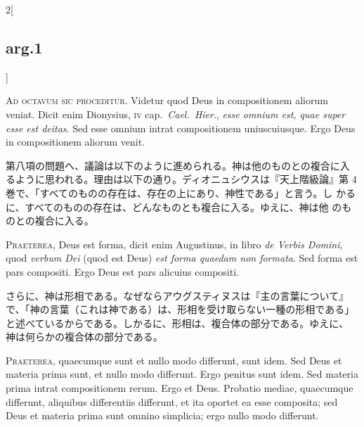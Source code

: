 \documentclass[paper=a4paper,fontsize=10pt,jafontsize=9pt,titlepage]{jlreq}
\begin{document}
\begin{paracol}{2}[\subsection{arg.1}]

{\huge A}{\scshape d octavum sic proceditur}. Videtur quod Deus in
 compositionem aliorum veniat. Dicit enim Dionysius, {\scshape iv}
 cap.~{\itshape Cael.~Hier}., {\itshape esse omnium est, quae super
 esse est deitas}. Sed esse omnium intrat compositionem
 uniuscuiusque. Ergo Deus in compositionem aliorum venit.

\switchcolumn

第八項の問題へ、議論は以下のように進められる。神は他のものとの複合に入
るように思われる。理由は以下の通り。ディオニュシウスは『天上階級論』第
4巻で、「すべてのものの存在は、存在の上にあり、神性である」と言う。し
かるに、すべてのものの存在は、どんなものとも複合に入る。ゆえに、神は他
のものとの複合に入る。


{\scshape Praeterea}, Deus est forma, dicit enim Augustinus, in libro
 {\itshape de Verbis Domini}, quod {\itshape verbum Dei} (quod est
 Deus) {\itshape est forma quaedam non formata}. Sed forma est pars
 compositi. Ergo Deus est pars alicuius compositi.

\switchcolumn

さらに、神は形相である。なぜならアウグスティヌスは『主の言葉について』
で、「神の言葉（これは神である）は、形相を受け取らない一種の形相である」
と述べているからである。しかるに、形相は、複合体の部分である。ゆえに、
神は何らかの複合体の部分である。


{\scshape Praeterea}, quaecumque sunt et nullo modo differunt, sunt
 idem. Sed Deus et materia prima sunt, et nullo modo differunt. Ergo
 penitus sunt idem. Sed materia prima intrat compositionem rerum. Ergo
 et Deus. Probatio mediae, quaecumque differunt, aliquibus differentiis
 differunt, et ita oportet ea esse composita; sed Deus et materia prima
 sunt omnino simplicia; ergo nullo modo differunt.

\switchcolumn


\end{paracol}
\end{document}
